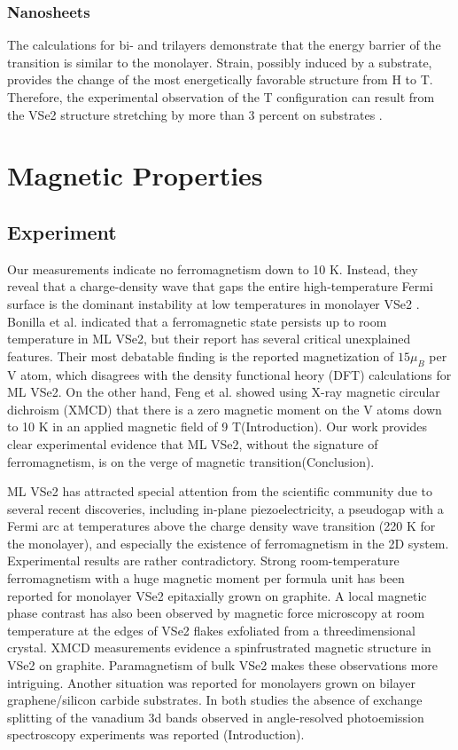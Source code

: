 \subsubsection{Nanosheets}
The calculations for bi- and trilayers demonstrate that the energy barrier of the transition is similar to the monolayer. Strain, possibly induced by a substrate, provides the change of the most energetically favorable structure from H to T. Therefore, the experimental observation of the T configuration can result from the VSe2 structure stretching by more than 3 percent on substrates \cite{C9CP03726H}.
\section{Magnetic Properties}
\subsection{Experiment}
Our measurements indicate no ferromagnetism down to 10 K. Instead, they reveal that a charge-density wave that gaps the entire high-temperature Fermi surface is the dominant instability at low temperatures in monolayer VSe2 \cite{doi:10.1021/acs.nanolett.8b01649}. Bonilla et al. indicated that a ferromagnetic state persists up to room temperature in ML VSe2, but their report has several critical unexplained features. Their most debatable finding is the reported magnetization of $15 \mu_{B}$ per V atom, which disagrees with the density functional heory (DFT) calculations for ML VSe2. On the other hand, Feng et al.\cite{doi:10.1021/acs.nanolett.8b01649} showed using X-ray magnetic circular dichroism (XMCD) that there is a zero magnetic moment on the V atoms down to 10 K in an applied magnetic field of 9 T(Introduction). Our work provides clear experimental evidence that ML VSe2, without the signature of ferromagnetism, is on the verge of magnetic transition\cite{doi:10.1021/acsnano.9b02996}(Conclusion).

ML VSe2 has attracted special attention from the scientific community due to several recent discoveries, including in-plane piezoelectricity, a pseudogap with a Fermi arc at temperatures above the charge density wave transition (220 K for the monolayer), and especially the existence of ferromagnetism in the 2D system. Experimental results are rather contradictory. Strong room-temperature ferromagnetism with a huge magnetic moment per formula unit has been reported for monolayer VSe2 epitaxially grown on graphite. A local magnetic phase contrast has also been observed by magnetic force microscopy at room temperature at the edges of VSe2 flakes exfoliated from a threedimensional crystal. XMCD measurements evidence a spinfrustrated magnetic structure in VSe2 on graphite. Paramagnetism of bulk VSe2 makes these observations more intriguing. Another situation was reported for monolayers grown on bilayer graphene/silicon carbide substrates. In both studies the absence of exchange splitting of the vanadium 3d bands observed in angle-resolved photoemission spectroscopy experiments was reported \cite{C9CP03726H}(Introduction).

